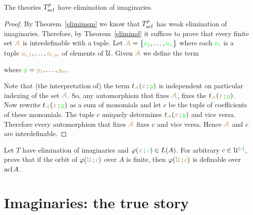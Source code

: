 \documentclass[creche.tex]{subfiles}
\begin{document}
\begin{theorem}\label{elimimacf} 
The theories $T^p_{\rm acf}$ have elimination of imaginaries.
\end{theorem}

\begin{proof}
By Theorem~\ref{elimimsm} we know that $T^p_{\rm acf}$ has weak elimination of imaginaries. Therefore, by Theorem~\ref{elimimd} it suffices to prove that every finite set ${\color{brown}\EuScript A}$ is interdefinable with a tuple. Let ${\color{brown}\EuScript A}=\big\{{\color{green} a_1},\dots,{\color{green} a_n}\big\}$ where each ${\color{green} a_i}$ is a tuple ${\color{brown} a_{i,1}},\dots,{\color{brown} a_{i,m}}$ of elements of $\EuScript U$. Given ${\color{brown}\EuScript A}$ we define the term

\hfill where ${\color{green} y}={\color{brown} y_1},\dots,{\color{brown} y_m}$.


Note that (the interpretation of) the term $t_{\color{brown}\EuScript A}({\color{brown} x}\,;{\color{green} y})$ is independent on particular indexing of the set ${\color{brown}\EuScript A}$. So, any automorphism that fixes ${\color{brown}\EuScript A}$, fixes the  $t_{\color{brown}\EuScript A}({\color{brown} x}\,;{\color{green} y})$. Now rewrite $t_{\color{brown}\EuScript A}({\color{brown} x}\,;{\color{green} y})$ as a sum of monomials and let $c$ be the tuple of coefficients of these monomials. The tuple $c$ uniquely determines $t_{\color{brown}\EuScript A}({\color{brown} x}\,;{\color{green} y})$ and vice versa. Therefore every automorphism that fixes  ${\color{brown}\EuScript A}$ fixes  $c$ and vice versa. Hence  ${\color{brown}\EuScript A}$ and  $c$ are interdefinable.
\end{proof}

\begin{exercise}
Let $T$ have elimination of imaginaries and $\varphi({\color{brown} x}\,;{\color{green} z})\in L(A)$. For arbitrary $c\in\EuScript U^{|{\color{green} z}|}$, prove that if the orbit of $\varphi({\color{brown}\EuScript U}\,; {\color{brown} c})$ over $A$ is finite, then $\varphi({\color{brown}\EuScript U}\,; {\color{brown} c})$ is definable over $\mathop{\rm acl} A$.\QED
\end{exercise}


\section{Imaginaries: the true story}\label{imaginaries_long}
\end{document}
